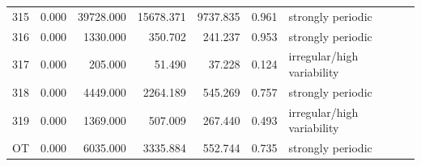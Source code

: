 \begin{longtable}{lrrrrrl}
315 & 0.000 & 39728.000 & 15678.371 & 9737.835 & 0.961 & strongly periodic \\
316 & 0.000 & 1330.000 & 350.702 & 241.237 & 0.953 & strongly periodic \\
317 & 0.000 & 205.000 & 51.490 & 37.228 & 0.124 & irregular/high variability \\
318 & 0.000 & 4449.000 & 2264.189 & 545.269 & 0.757 & strongly periodic \\
319 & 0.000 & 1369.000 & 507.009 & 267.440 & 0.493 & irregular/high variability \\
OT & 0.000 & 6035.000 & 3335.884 & 552.744 & 0.735 & strongly periodic \\
\bottomrule
\end{longtable}